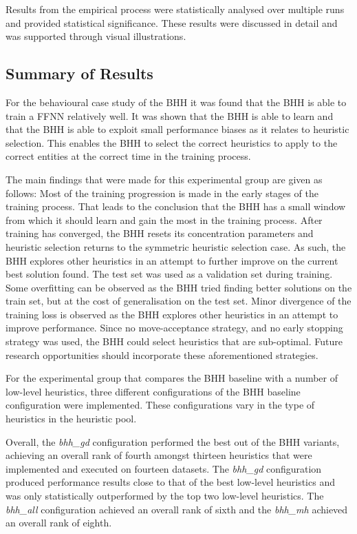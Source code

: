 Results from the empirical process were statistically analysed over multiple runs and provided statistical significance. These results were discussed in detail and was supported through visual illustrations.

\subsection{Summary of Results}
\label{sec:conclusion:results}

For the behavioural case study of the \acs{BHH} it was found that the \ac{BHH} is able to train a \acf{FFNN} relatively well. It was shown that the \ac{BHH} is able to learn and that the \acs{BHH} is able to exploit small performance biases as it relates to heuristic selection. This enables the \acs{BHH} to select the correct heuristics to apply to the correct entities at the correct time in the training process.

The main findings that were made for this experimental group are given as follows: Most of the training progression is made in the early stages of the training process. That leads to the conclusion that the \acs{BHH} has a small window from which it should learn and gain the most in the training process. After training has converged, the \acs{BHH} resets its concentration parameters and heuristic selection returns to the symmetric heuristic selection case. As such, the \acs{BHH} explores other heuristics in an attempt to further improve on the current best solution found. The test set was used as a validation set during training. Some overfitting can be observed as the \acs{BHH} tried finding better solutions on the train set, but at the cost of generalisation on the test set. Minor divergence of the training loss is observed as the \acs{BHH} explores other heuristics in an attempt to improve performance. Since no move-acceptance strategy, and no early stopping strategy was used, the \acs{BHH} could select heuristics that are sub-optimal. Future research opportunities should incorporate these aforementioned strategies.

For the experimental group that compares the \acs{BHH} baseline with a number of  low-level heuristics, three different configurations of the \acs{BHH} baseline configuration were implemented. These configurations vary in the type of heuristics in the heuristic pool.

Overall, the \textit{bhh\_gd} configuration performed the best out of the \acs{BHH} variants, achieving an overall rank of fourth amongst thirteen heuristics that were implemented and executed on fourteen datasets. The \textit{bhh\_gd} configuration produced performance results close to that of the best low-level heuristics and was only statistically outperformed by the top two low-level heuristics. The \textit{bhh\_all} configuration achieved an overall rank of sixth and the \textit{bhh\_mh} achieved an overall rank of eighth.

